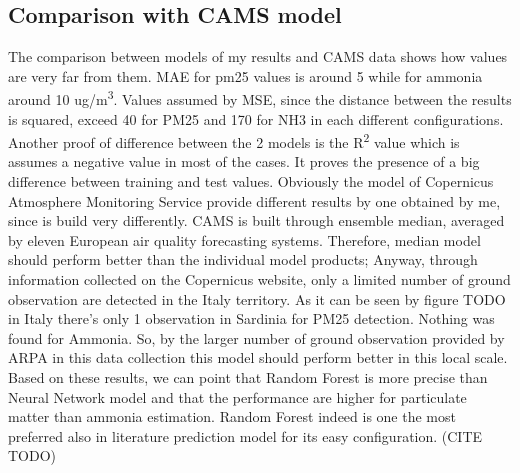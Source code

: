 \subsection{Comparison with CAMS model}
The comparison between models of my results and CAMS data shows how values are very far from them. MAE for pm25 values is around 5 while for ammonia around 10 ug/m\textsuperscript{3}. Values assumed by MSE, since the distance between the results is squared, exceed 40 for PM25 and 170 for NH3 in each different configurations.
Another proof of difference between the 2 models is the R\textsuperscript{2} value which is assumes a negative value in most of the cases. It proves the presence of a big difference between training and test values. 
Obviously the model of Copernicus Atmosphere Monitoring Service provide different results by one obtained by me, since is build very differently. CAMS is built through ensemble median, averaged by eleven European air quality forecasting systems. Therefore, median model should perform better than the individual model products\cite{riccio2007seeking}; 
Anyway, through information collected on the Copernicus website, only a limited number of ground observation are detected in the Italy territory. As it can be seen by figure TODO in Italy there's only 1 observation in Sardinia for PM25 detection. Nothing was found for Ammonia.
So, by the larger number of ground observation provided by ARPA in this data collection this model should perform better in this local scale.
\bigbreak
Based on these results, we can point that Random Forest is more precise than Neural Network model and that the performance are higher for particulate matter than ammonia estimation.
Random Forest indeed is one the most preferred also in literature prediction model for its easy configuration. (CITE TODO)

